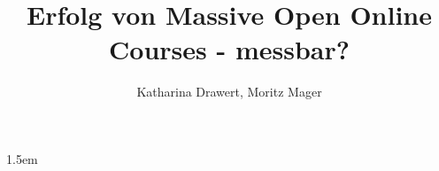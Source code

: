 \documentclass[man,floatsintext,donotrepeattitle,a4paper]{apa6}
\author{Katharina Drawert, Moritz Mager}
\affiliation{Leuphana Universität Lüneburg}
\title{Erfolg von Massive Open Online Courses - messbar?}
\makeatletter
\def\flushboth{%
      \let\\\@normalcr
        \@rightskip\z@skip \rightskip\@rightskip
          \leftskip\z@skip
            \parindent 1.5em\relax}
\makeatother
\begin{document}
\maketitle
\flushboth






\listoffigures 
\listoftables
\printbibliography
\end{document}
